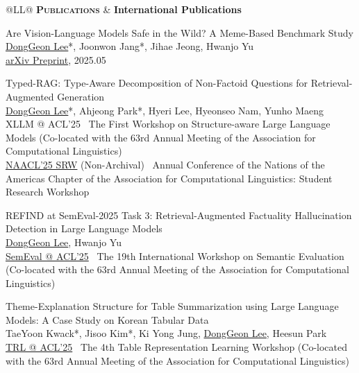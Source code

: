\documentclass[11pt,a4paper]{article}
\newlength{\leftcolumn}
\newlength{\rightcolumn}
\newlength{\midrightcolumn}
\newcounter{pubnum}
\newenvironment{publications}
{\begin{list}{}
    {\setlength{\leftmargin}{1.35in}
     \setlength{\itemsep}{0.5em}
     \setlength{\labelsep}{0em}
     \renewcommand{\makelabel}[1]{##1}}}
{\end{list}}
\newcommand{\pubitem}[1]{%
    \addtocounter{pubnum}{-1}%
    \item[\textup{[\arabic{pubnum}]}] #1%
}
\begin{document}
\vspace{1em}

\begin{tabular}{@{}L{\leftcolumn}L{\midrightcolumn}@{}}
\textcolor{sectioncolor}{\textsc{\textbf{Publications}}} & \textbf{International Publications}
\end{tabular}
\vspace{-0.5em}

\begin{publications}


\pubitem{
    Are Vision-Language Models Safe in the Wild? A Meme-Based Benchmark Study\\
        \underline{DongGeon Lee}*, Joonwon Jang*, Jihae Jeong,  Hwanjo Yu \\[3pt]
        \href{https://arxiv.org/abs/2505.15389v1}{arXiv Preprint}, 2025.05
}

\pubitem{
    Typed-RAG: Type-Aware Decomposition of Non-Factoid Questions for Retrieval-Augmented Generation \\
        \underline{DongGeon Lee}*, Ahjeong Park*, Hyeri Lee, Hyeonseo Nam, Yunho Maeng \\[3pt]
        XLLM @ ACL'25 \textbar\ The First Workshop on Structure-aware Large Language Models (Co-located with the 63rd Annual Meeting of the Association for Computational Linguistics) \\[1.5pt]
        \href{https://arxiv.org/abs/2503.15879}{NAACL'25 SRW} (Non-Archival) \textbar\ Annual Conference of the Nations of the Americas Chapter of the Association for Computational Linguistics: Student Research Workshop
        
}


\pubitem{
    REFIND at SemEval-2025 Task 3: Retrieval-Augmented Factuality Hallucination Detection in Large Language Models\\
        \underline{DongGeon Lee}, Hwanjo Yu \\[3pt]
        \href{https://arxiv.org/abs/2502.13622}{SemEval @ ACL'25} \textbar\ The 19th International Workshop on Semantic Evaluation (Co-located with the 63rd Annual Meeting of the Association for Computational Linguistics)
}

\pubitem{
    Theme-Explanation Structure for Table Summarization using Large Language Models: A Case Study on Korean Tabular Data \\
        TaeYoon Kwack*, Jisoo Kim*, Ki Yong Jung, \underline{DongGeon Lee}, Heesun Park  \\[3pt]
        \href{https://openreview.net/forum?id=Xwpn1unH8F}{TRL @ ACL'25} \textbar\ The 4th Table Representation Learning Workshop (Co-located with the 63rd Annual Meeting of the Association for Computational Linguistics)
}


\end{publications}
\end{document}
